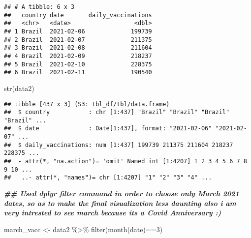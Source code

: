\documentclass[
]{article}
\newenvironment{Shaded}{\begin{snugshade}}{\end{snugshade}}
\newcommand{\CommentTok}[1]{\textcolor[rgb]{0.56,0.35,0.01}{\textit{#1}}}
\newcommand{\DecValTok}[1]{\textcolor[rgb]{0.00,0.00,0.81}{#1}}
\newcommand{\DocumentationTok}[1]{\textcolor[rgb]{0.56,0.35,0.01}{\textbf{\textit{#1}}}}
\newcommand{\FunctionTok}[1]{\textcolor[rgb]{0.00,0.00,0.00}{#1}}
\newcommand{\NormalTok}[1]{#1}
\newcommand{\OtherTok}[1]{\textcolor[rgb]{0.56,0.35,0.01}{#1}}
\newcommand{\SpecialCharTok}[1]{\textcolor[rgb]{0.00,0.00,0.00}{#1}}
\begin{document}
\begin{verbatim}
## # A tibble: 6 x 3
##   country date       daily_vaccinations
##   <chr>   <date>                  <dbl>
## 1 Brazil  2021-02-06             199739
## 2 Brazil  2021-02-07             211375
## 3 Brazil  2021-02-08             211604
## 4 Brazil  2021-02-09             218237
## 5 Brazil  2021-02-10             228375
## 6 Brazil  2021-02-11             190540
\end{verbatim}

\begin{Shaded}
\begin{Highlighting}[]
\FunctionTok{str}\NormalTok{(data2)}
\end{Highlighting}
\end{Shaded}

\begin{verbatim}
## tibble [437 x 3] (S3: tbl_df/tbl/data.frame)
##  $ country           : chr [1:437] "Brazil" "Brazil" "Brazil" "Brazil" ...
##  $ date              : Date[1:437], format: "2021-02-06" "2021-02-07" ...
##  $ daily_vaccinations: num [1:437] 199739 211375 211604 218237 228375 ...
##  - attr(*, "na.action")= 'omit' Named int [1:4207] 1 2 3 4 5 6 7 8 9 10 ...
##   ..- attr(*, "names")= chr [1:4207] "1" "2" "3" "4" ...
\end{verbatim}

\begin{Shaded}
\end{Shaded}

\begin{Shaded}
\begin{Highlighting}[]
\DocumentationTok{\#\# Used dplyr \textquotesingle{}filter\textquotesingle{} command in order to choose only March 2021 dates, so as to make the final visualization less daunting also i am very intrested to see march because its a Covid Anniversary :)  }

\NormalTok{march\_vacc }\OtherTok{\textless{}{-}}\NormalTok{ data2 }\SpecialCharTok{\%\textgreater{}\%}
  \FunctionTok{filter}\NormalTok{(}\FunctionTok{month}\NormalTok{(date)}\SpecialCharTok{==}\DecValTok{3}\NormalTok{)}
\end{Highlighting}
\end{Shaded}
\end{document}

